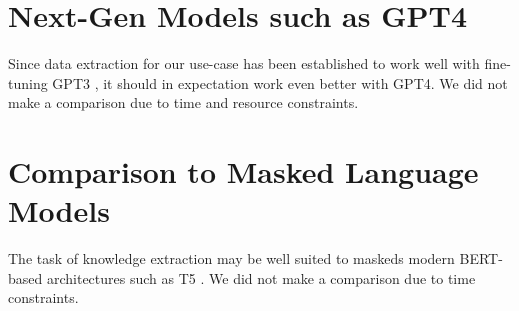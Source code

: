 \section{Next-Gen Models such as GPT4}\label{sec:next-gen}
Since data extraction for our use-case has been established to work well with fine-tuning \gls{GPT3} \cite{dunn_structured_2022}, it should in expectation work even better with \gls{GPT4}.
We did not make a comparison due to time and resource constraints.

\section{Comparison to Masked Language Models}\label{sec:masked}
The task of knowledge extraction may be well suited to \glspl{masked} modern \gls{BERT}-based architectures such as T5 \cite{raffel_exploring_2020}.
We did not make a comparison due to time constraints.
